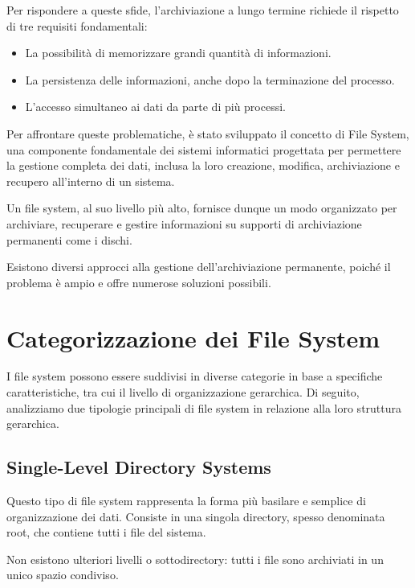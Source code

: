 \documentclass[12pt,a4paper,openright,twoside]{book}
\begin{document}
        Per rispondere a queste sfide, l'archiviazione a lungo termine richiede il rispetto di tre requisiti fondamentali:

        \begin{itemize}
            \item La possibilità di memorizzare grandi quantità di informazioni.
            \item La persistenza delle informazioni, anche dopo la terminazione del processo.
            \item L'accesso simultaneo ai dati da parte di più processi.
        \end{itemize}

        Per affrontare queste problematiche, è stato sviluppato il concetto di File System, una componente fondamentale dei sistemi informatici progettata per permettere la gestione completa dei dati, inclusa la loro creazione, modifica, archiviazione e recupero all'interno di un sistema.

        Un file system, al suo livello più alto, fornisce dunque un modo organizzato per archiviare, recuperare e gestire informazioni su supporti di archiviazione permanenti come i dischi.

        Esistono diversi approcci alla gestione dell'archiviazione permanente, poiché il problema è ampio e offre numerose soluzioni possibili.
        \cite{giampaolo1998practical}\cite{tanenbaum2015modern}

    \section{Categorizzazione dei File System}

        I file system possono essere suddivisi in diverse categorie in base a specifiche caratteristiche, tra cui il livello di organizzazione gerarchica. Di seguito, analizziamo due tipologie principali di file system in relazione alla loro struttura gerarchica.


        \subsection{Single-Level Directory Systems}

            Questo tipo di file system rappresenta la forma più basilare e semplice di organizzazione dei dati. Consiste in una singola directory, spesso denominata root, che contiene tutti i file del sistema.

            Non esistono ulteriori livelli o sottodirectory: tutti i file sono archiviati in un unico spazio condiviso.
\end{document}
